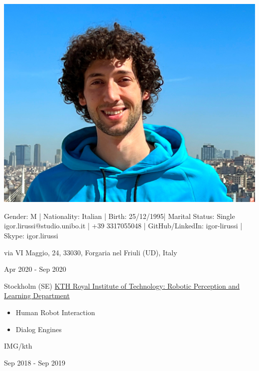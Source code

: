 \documentclass[paper=a4,fontsize=11pt, hidelinks]{temp} %
\begin{document}
\begin{minipage}{.2\linewidth}
   \includegraphics[width=1\textwidth]{photo}
\end{minipage}      
\begin{minipage}{0.7\linewidth}
   \sepspace
   \noindent
   \hfill Gender: M | Nationality: Italian | Birth: 25/12/1995| Marital Status: Single
   \hfill igor.lirussi@studio.unibo.it | +39 3317055048 | GitHub/LinkedIn: igor-lirussi | Skype: igor.lirussi

   
   \hfill via VI Maggio, 24, 33030, Forgaria nel Friuli (UD), Italy
 
\end{minipage}


\noindent

{Apr 2020 - Sep 2020}

{Stockholm (SE) \href{https://www.kth.se/is/rpl}{KTH Royal Institute of Technology: Robotic Perception and Learning Department}}
{
 \begin{itemize}
    \item Human Robot Interaction
    \item Dialog Engines
 \end{itemize}
} {IMG/kth}

\sepspace

{Sep 2018 - Sep 2019 }
\end{document}
